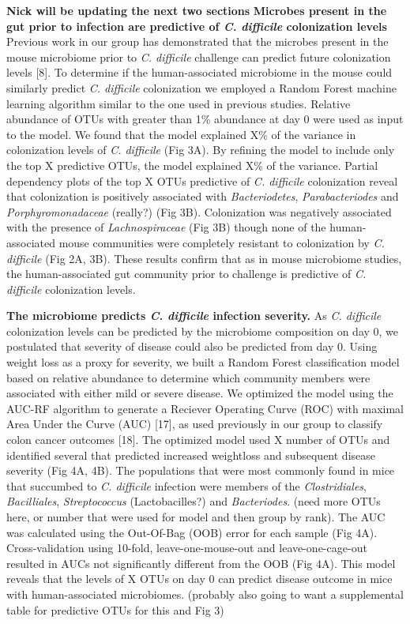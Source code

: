 \documentclass[11pt,]{article}
\begin{document}
\textbf{Nick will be updating the next two sections} \textbf{Microbes
present in the gut prior to infection are predictive of \emph{C.
difficile} colonization levels} Previous work in our group has
demonstrated that the microbes present in the mouse microbiome prior to
\emph{C. difficile} challenge can predict future colonization levels
{[}8{]}. To determine if the human-associated microbiome in the mouse
could similarly predict \emph{C. difficile} colonization we employed a
Random Forest machine learning algorithm similar to the one used in
previous studies. Relative abundance of OTUs with greater than 1\%
abundance at day 0 were used as input to the model. We found that the
model explained X\% of the variance in colonization levels of \emph{C.
difficile} (Fig 3A). By refining the model to include only the top X
predictive OTUs, the model explained X\% of the variance. Partial
dependency plots of the top X OTUs predictive of \emph{C. difficile}
colonization reveal that colonization is positively associated with
\emph{Bacteriodetes}, \emph{Parabacteriodes} and
\emph{Porphyromonadaceae} (really?) (Fig 3B). Colonization was
negatively associated with the presence of \emph{Lachnospiraceae} (Fig
3B) though none of the human-associated mouse communities were
completely resistant to colonization by \emph{C. difficile} (Fig 2A,
3B). These results confirm that as in mouse microbiome studies, the
human-associated gut community prior to challenge is predictive of
\emph{C. difficile} colonization levels.

\textbf{The microbiome predicts \emph{C. difficile} infection severity.}
As \emph{C. difficile} colonization levels can be predicted by the
microbiome composition on day 0, we postulated that severity of disease
could also be predicted from day 0. Using weight loss as a proxy for
severity, we built a Random Forest classification model based on
relative abundance to determine which community members were associated
with either mild or severe disease. We optimized the model using the
AUC-RF algorithm to generate a Reciever Operating Curve (ROC) with
maximal Area Under the Curve (AUC) {[}17{]}, as used previously in our
group to classify colon cancer outcomes {[}18{]}. The optimized model
used X number of OTUs and identified several that predicted increased
weightloss and subsequent disease severity (Fig 4A, 4B). The populations
that were most commonly found in mice that succumbed to \emph{C.
difficile} infection were members of the \emph{Clostridiales},
\emph{Bacilliales}, \emph{Streptococcus} (Lactobacilles?) and
\emph{Bacteriodes}. (need more OTUs here, or number that were used for
model and then group by rank). The AUC was calculated using the
Out-Of-Bag (OOB) error for each sample (Fig 4A). Cross-validation using
10-fold, leave-one-mouse-out and leave-one-cage-out resulted in AUCs not
significantly different from the OOB (Fig 4A). This model reveals that
the levels of X OTUs on day 0 can predict disease outcome in mice with
human-associated microbiomes. (probably also going to want a
supplemental table for predictive OTUs for this and Fig 3)
\end{document}
